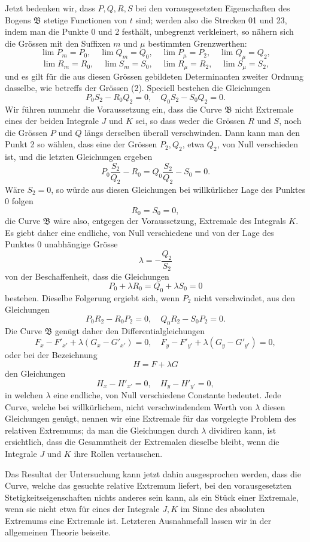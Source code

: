 \documentclass[11pt,a4paper,leqno]{article}
\begin{document}
Jetzt bedenken wir, dass $P,Q,R,S$ bei den vorausgesetzten Eigenschaften des Bogens $\mathfrak{B}$ stetige Functionen von $t$ sind; werden also die Strecken 01 und 23, indem man die Punkte 0 und 2 festhält, unbegrenzt verkleinert, so nähern sich die Grössen mit den Suffixen $m$ und $\mu$ bestimmten Grenzwerthen:
\[
\lim P_m=P_0,
\quad
\lim Q_m=Q_0,
\quad
\lim P_\mu=P_2,
\quad
\lim Q_\mu=Q_2,
\]
\[
\lim R_m=R_0,
\quad
\lim S_m=S_0,
\quad
\lim R_\mu=R_2,
\quad
\lim S_\mu=S_2,
\]
und es gilt für die aus diesen Grössen gebildeten Determinanten zweiter Ordnung dasselbe, wie betreffs der Grössen (2). Speciell bestehen die Gleichungen
\[
P_0S_2-R_0Q_2=0,
\quad
Q_0S_2-S_0Q_2=0.
\]
Wir führen nunmehr die Voraussetzung ein, dass die Curve $\mathfrak{B}$ nicht Extremale eines der beiden Integrale $J$ und $K$ sei, so dass weder die Grössen $R$ und $S$, noch die Grössen $P$ und $Q$ längs derselben überall verschwinden. Dann kann man den Punkt 2 so wählen, dass eine der Grössen $P_2,Q_2$, etwa $Q_2$, von Null verschieden ist, und die letzten Gleichungen ergeben
\[
P_0\frac{S_2}{Q_2}-R_0=Q_0\frac{S_2}{Q_2}-S_0=0.
\]
Wäre $S_2=0$, so würde aus diesen Gleichungen bei willkürlicher Lage des Punktes 0 folgen
\[
R_0=S_0=0,
\]
die Curve $\mathfrak{B}$ wäre also, entgegen der Voraussetzung, Extremale des Integrals $K$. Es giebt daher eine endliche, von Null verschiedene und von der Lage des Punktes 0 unabhängige Grösse
\[
\lambda=-\frac{Q_2}{S_2}
\]
von der Beschaffenheit, dass die Gleichungen
\[
P_0+\lambda R_0=Q_0+\lambda S_0=0
\]
bestehen. Dieselbe Folgerung ergiebt sich, wenn $P_2$ nicht verschwindet, aus den Gleichungen
\[
P_0R_2-R_0P_2=0,
\quad
Q_0R_2-S_0P_2=0.
\]
Die Curve $\mathfrak{B}$ genügt daher den Differentialgleichungen
\[
F_x-F'_{x'}+\lambda(G_x-G'_{x'})=0,
\quad
F_y-F'_{y'}+\lambda(G_y-G'_{y'})=0,
\]
oder bei der Bezeichnung
\[
H=F+\lambda G
\]
den Gleichungen
\[
H_x-H'_{x'}=0,
\quad
H_y-H'_{y'}=0,
\]
in welchen $\lambda$ eine endliche, von Null verschiedene Constante bedeutet. Jede Curve, welche bei willkürlichem, nicht verschwindendem Werth von $\lambda$ diesen Gleichungen genügt, nennen wir eine Extremale für das vorgelegte Problem des relativen Extremums; da man die Gleichungen durch $\lambda$ dividiren kann, ist ersichtlich, dass die Gesammtheit der Extremalen dieselbe bleibt, wenn die Integrale $J$ und $K$ ihre Rollen vertauschen.

Das Resultat der Untersuchung kann jetzt dahin ausgesprochen werden, dass die Curve, welche das gesuchte relative Extremum liefert, bei den vorausgesetzten Stetigkeitseigenschaften nichts anderes sein kann, als ein Stück einer Extremale, wenn sie nicht etwa für eines der Integrale $J,K$ im Sinne des absoluten Extremums eine Extremale ist. Letzteren Ausnahmefall lassen wir in der allgemeinen Theorie beiseite.
\end{document}
